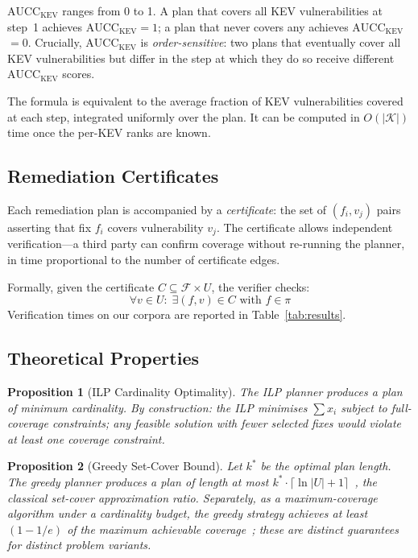 \documentclass[conference]{IEEEtran}
\newtheorem{proposition}{Proposition}
\newcommand{\aucc}{$\mathrm{AUCC}_{\mathrm{KEV}}$\xspace}
\begin{document}
\aucc ranges from 0 to 1.  A plan that covers all KEV vulnerabilities
at step~1 achieves \aucc $= 1$; a plan that never covers any achieves
\aucc $= 0$.  Crucially, \aucc is \emph{order-sensitive}: two plans
that eventually cover all KEV vulnerabilities but differ in the step
at which they do so receive different \aucc scores.

The formula is equivalent to the average fraction of KEV vulnerabilities
covered at each step, integrated uniformly over the plan.  It can be
computed in $O(|\mathcal{K}|)$ time once the per-KEV ranks are known.

\subsection{Remediation Certificates}

Each remediation plan is accompanied by a \emph{certificate}: the set
of $(f_i, v_j)$ pairs asserting that fix $f_i$ covers vulnerability
$v_j$.  The certificate allows independent verification---a third party
can confirm coverage without re-running the planner, in time
proportional to the number of certificate edges.

Formally, given the certificate $C \subseteq \mathcal{F} \times U$,
the verifier checks:
\[
  \forall v \in U:\;
    \exists (f, v) \in C \text{ with } f \in \pi
\]
Verification times on our corpora are reported in
Table~\ref{tab:results}.

\subsection{Theoretical Properties}

\begin{proposition}[ILP Cardinality Optimality]
The ILP planner produces a plan of minimum cardinality.
\emph{By construction}: the ILP minimises $\sum x_i$ subject to
full-coverage constraints; any feasible solution with fewer selected
fixes would violate at least one coverage constraint.
\end{proposition}

\begin{proposition}[Greedy Set-Cover Bound]
Let $k^*$ be the optimal plan length.  The greedy planner produces a
plan of length at most
$k^* \cdot \lceil \ln |U| + 1 \rceil$~\cite{johnson74},
the classical set-cover approximation ratio.
Separately, as a maximum-coverage algorithm under a cardinality
budget, the greedy strategy achieves at least $(1 - 1/e)$ of the
maximum achievable coverage~\cite{nemhauser78}; these are distinct
guarantees for distinct problem variants.
\end{proposition}
\end{document}
